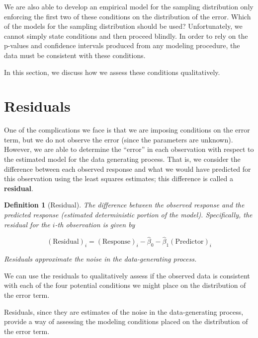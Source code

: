 \documentclass[
]{book}
\theoremstyle{plain}
\theoremstyle{mydefn}
\newtheorem{definition}{Definition}[chapter]
\theoremstyle{myexmpl}
\theoremstyle{remark}
\begin{document}
We are also able to develop an empirical model for the sampling distribution only enforcing the first two of these conditions on the distribution of the error. Which of the models for the sampling distribution should be used? Unfortunately, we cannot simply state conditions and then proceed blindly. In order to rely on the p-values and confidence intervals produced from any modeling procedure, the data must be consistent with these conditions.

In this section, we discuss how we assess these conditions qualitatively.

\hypertarget{residuals}{%
\section{Residuals}\label{residuals}}

One of the complications we face is that we are imposing conditions on the error term, but we do not observe the error (since the parameters are unknown). However, we are able to determine the ``error'' in each observation with respect to the estimated model for the data generating process. That is, we consider the difference between each observed response and what we would have predicted for this observation using the least squares estimates; this difference is called a \textbf{residual}.

\begin{definition}[Residual]
\protect\hypertarget{def:defn-residual}{}{\label{def:defn-residual} {} }The difference between the observed response and the predicted response (estimated deterministic portion of the model). Specifically, the residual for the \(i\)-th observation is given by

\[(\text{Residual})_i = (\text{Response})_i - \widehat{\beta}_0 - \widehat{\beta}_1 (\text{Predictor})_{i}\]

Residuals approximate the noise in the data-generating process.
\end{definition}

We can use the residuals to qualitatively assess if the observed data is consistent with each of the four potential conditions we might place on the distribution of the error term.

\begin{rmdkeyidea}
Residuals, since they are estimates of the noise in the data-generating process, provide a way of assessing the modeling conditions placed on the distribution of the error term.
\end{rmdkeyidea}
\end{document}
